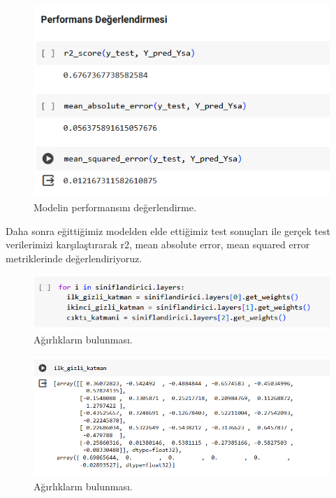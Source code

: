 \documentclass[12pt, a4paper]{article}
\begin{document}
	
	\begin{figure}[!h]
		\centering
		\includegraphics{5.7.png}
		\caption{Modelin performansını değerlendirme.}
	\end{figure}
	\newpage Daha sonra eğittiğimiz modelden elde ettiğimiz test sonuçları ile gerçek test verilerimizi karşılaştırarak r2, mean absolute error, mean squared error metriklerinde değerlendiriyoruz.
	
	
	\begin{figure}[!h]
		\centering
		\includegraphics{5.8.png}
		\caption{Ağırlıkların bulunması.}
	\end{figure}
	\newpage
	\begin{figure}[!h]
		\centering
		\includegraphics{5.9.png}
		\caption{Ağırlıkların bulunması.}
	\end{figure}
	
\end{document}
